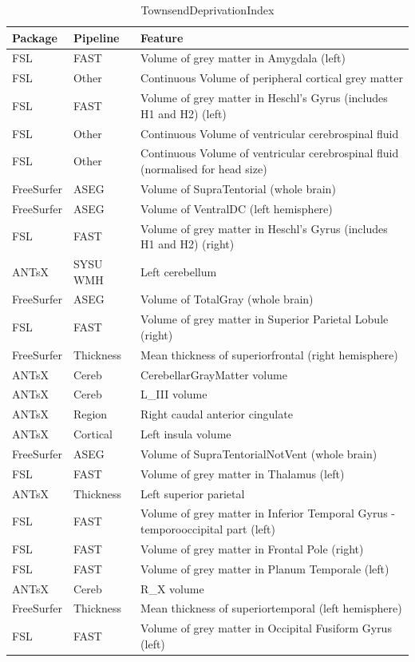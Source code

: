 \documentclass[
  10pt,
]{article}
\begin{document}
\begin{table}

\caption{\label{tab:compare-predictions}TownsendDeprivationIndex}
\centering
\begin{tabular}[t]{lll}
\toprule
Package & Pipeline & Feature\\
\midrule
FSL & FAST & Volume of grey matter in Amygdala (left)\\
FSL & Other & Continuous    Volume of peripheral cortical grey matter\\
FSL & FAST & Volume of grey matter in Heschl's Gyrus (includes H1 and H2) (left)\\
FSL & Other & Continuous    Volume of ventricular cerebrospinal fluid\\
FSL & Other & Continuous    Volume of ventricular cerebrospinal fluid (normalised for head size)\\
\addlinespace
FreeSurfer & ASEG & Volume of SupraTentorial (whole brain)\\
FreeSurfer & ASEG & Volume of VentralDC (left hemisphere)\\
FSL & FAST & Volume of grey matter in Heschl's Gyrus (includes H1 and H2) (right)\\
ANTsX & SYSU WMH & Left cerebellum\\
FreeSurfer & ASEG & Volume of TotalGray (whole brain)\\
\addlinespace
FSL & FAST & Volume of grey matter in Superior Parietal Lobule (right)\\
FreeSurfer & Thickness & Mean thickness of superiorfrontal (right hemisphere)\\
ANTsX & Cereb & CerebellarGrayMatter volume\\
ANTsX & Cereb & L\_III volume\\
ANTsX & Region & Right caudal anterior cingulate\\
\addlinespace
ANTsX & Cortical & Left insula volume\\
FreeSurfer & ASEG & Volume of SupraTentorialNotVent (whole brain)\\
FSL & FAST & Volume of grey matter in Thalamus (left)\\
ANTsX & Thickness & Left superior parietal\\
FSL & FAST & Volume of grey matter in Inferior Temporal Gyrus - temporooccipital part (left)\\
\addlinespace
FSL & FAST & Volume of grey matter in Frontal Pole (right)\\
FSL & FAST & Volume of grey matter in Planum Temporale (left)\\
ANTsX & Cereb & R\_X volume\\
FreeSurfer & Thickness & Mean thickness of superiortemporal (left hemisphere)\\
FSL & FAST & Volume of grey matter in Occipital Fusiform Gyrus (left)\\
\bottomrule
\end{tabular}
\end{table}
\end{document}
